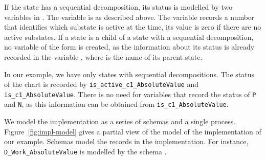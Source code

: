 \documentclass[submission]{eptcs}
\begin{document}
If the state has a sequential decomposition, its status is modelled by two variables in . The variable  is as described above. The variable  records a number that identifies which substate is active at the time, its value is zero if there are no active substates. If a state is a child of a state with a sequential decomposition, no variable of the form  is created, as the information about its status is already recorded in the variable , where  is the name of its parent state.

In our example, we have only states with sequential decompositions. The status of the chart is recorded by \texttt{is\_active\_c1\_AbsoluteValue} and \texttt{is\_c1\_AbsoluteValue}. There is no need for variables that record the status of \texttt{P} and \texttt{N}, as this information can be obtained from \texttt{is\_c1\_AbsoluteValue}.








We model the implementation as a series of schemas and a single process. Figure~\ref{fig:impl-model} gives a partial view of the model of the implementation of our example. Schemas model the records in the implementation. For instance, \texttt{D\_Work\_AbsoluteValue} is modelled by the schema .
\end{document}
